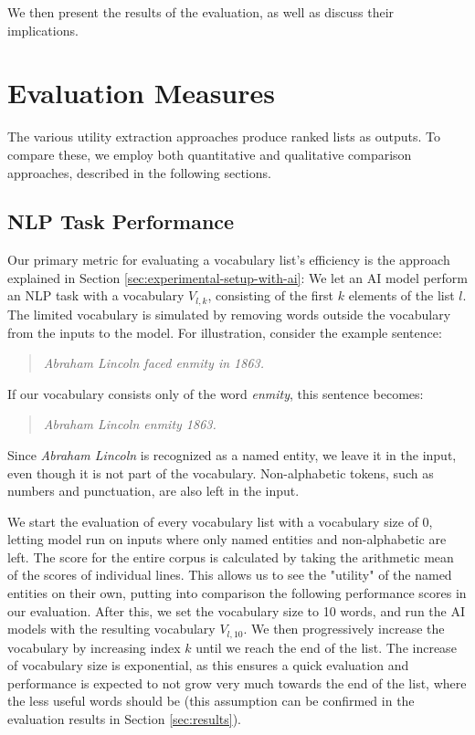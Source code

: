 We then present the results of the evaluation, as well as discuss their implications.

\section{Evaluation Measures}

The various utility extraction approaches produce ranked lists as outputs.
To compare these, we employ both quantitative and qualitative comparison approaches, described in the following sections.

\subsection{NLP Task Performance}
Our primary metric for evaluating a vocabulary list's efficiency is the approach explained in Section \ref{sec:experimental-setup-with-ai}:
We let an AI model perform an NLP task with a vocabulary $V_{l, k}$, consisting of the first $k$ elements of the list $l$.
The limited vocabulary is simulated by removing words outside the vocabulary from the inputs to the model.
For illustration, consider the example sentence:

\begin{quote}
	\textit{Abraham Lincoln faced enmity in 1863.}
\end{quote}

If our vocabulary consists only of the word \textit{enmity}, this sentence becomes:

\begin{quote}
	\textit{Abraham Lincoln enmity 1863.}
\end{quote}

Since \textit{Abraham Lincoln} is recognized as a named entity, we leave it in the input, even though it is not part of the vocabulary.
Non-alphabetic tokens, such as numbers and punctuation, are also left in the input.


We start the evaluation of every vocabulary list with a vocabulary size of 0, letting model run on inputs where only named entities and non-alphabetic are left.
The score for the entire corpus is calculated by taking the arithmetic mean of the scores of individual lines.
This allows us to see the "utility" of the named entities on their own, putting into comparison the following performance scores in our evaluation.
After this, we set the vocabulary size to 10 words, and run the AI models with the resulting vocabulary $V_{l, 10}$.
We then progressively increase the vocabulary by increasing index $k$ until we reach the end of the list.
The increase of vocabulary size is exponential, as this ensures a quick evaluation and performance is expected to not grow very much towards the end of the list, where the less useful words should be (this assumption can be confirmed in the evaluation results in Section \ref{sec:results}).

